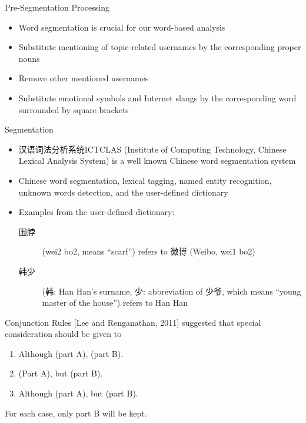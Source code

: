 \documentclass[12pt]{beamer}
\newcommand{\1}[1]{{\mathbf 1}\left\{#1\right\}}        %
\begin{document}
\begin{frame}{Pre-Segmentation Processing}

\begin{itemize}[<+->]
\item Word segmentation is crucial for our word-based analysis
\item Substitute mentioning of topic-related usernames by the corresponding proper nouns
\item Remove other mentioned usernames
\item Substitute emotional symbols and Internet slangs  by the corresponding word surrounded by square brackets
\end{itemize}

\end{frame}


\begin{frame}{Segmentation}

\begin{itemize}[<+->]
\item  汉语词法分析系统ICTCLAS (Institute of Computing Technology, Chinese Lexical Analysis System) is a well known Chinese word segmentation system 
\item Chinese word segmentation, lexical tagging, named entity recognition, unknown words detection, and the user-defined dictionary
\item Examples from the user-defined dictionary:
\begin{description}
\item[围脖] (wei2 bo2, means ``scarf'') refers to 微博 (Weibo, wei1 bo2)
\item[韩少] (韩: Han Han's surname, 少: abbreviation of 少爷, which means ``young master of the house'') refers to Han Han
\end{description}

\end{itemize}

\end{frame}

\begin{frame}{Conjunction Rules}
[Lee and Renganathan, 2011] suggested that special consideration should be given to
\begin{block}{}
\begin{enumerate}
\item Although (part A), (part B).
\item (Part A), but (part B).
\item Although (part A), but (part B).
\end{enumerate}
\end{block}
For each case, only part B will be kept.
\end{frame}
\end{document}
